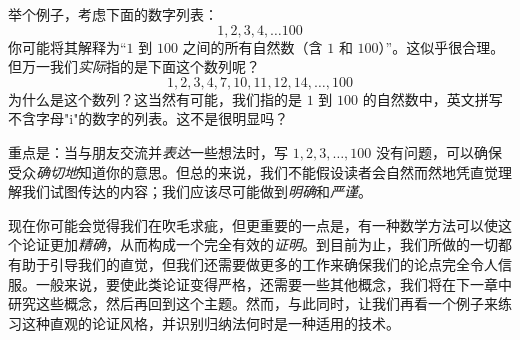 举个例子，考虑下面的数字列表：
\[1,2,3,4,\dots 100\]
你可能将其解释为``$1$ 到 $100$ 之间的所有自然数（含 $1$ 和 $100$）''。这似乎很合理。但万一我们\emph{实际}指的是下面这个数列呢？
\[1, 2, 3, 4, 7, 10, 11, 12, 14, \dots , 100\]
为什么是这个数列？这当然有可能，我们指的是 $1$ 到 $100$ 的自然数中，英文拼写不含字母"i"的数字的列表。这不是很明显吗？

重点是：当与朋友交流并\emph{表达}一些想法时，写 $1,2,3, \dots, 100$ 没有问题，可以确保受众\emph{确切地}知道你的意思。但总的来说，我们不能假设读者会自然而然地凭直觉理解我们试图传达的内容；我们应该尽可能做到\emph{明确}和\emph{严谨}。

现在你可能会觉得我们在吹毛求疵，但更重要的一点是，有一种数学方法可以使这个论证更加\emph{精确}，从而构成一个完全有效的\emph{证明}。到目前为止，我们所做的一切都有助于引导我们的直觉，但我们还需要做更多的工作来确保我们的论点完全令人信服。一般来说，要使此类论证变得严格，还需要一些其他概念，我们将在下一章中研究这些概念，然后再回到这个主题。然而，与此同时，让我们再看一个例子来练习这种直观的论证风格，并识别归纳法何时是一种适用的技术。
